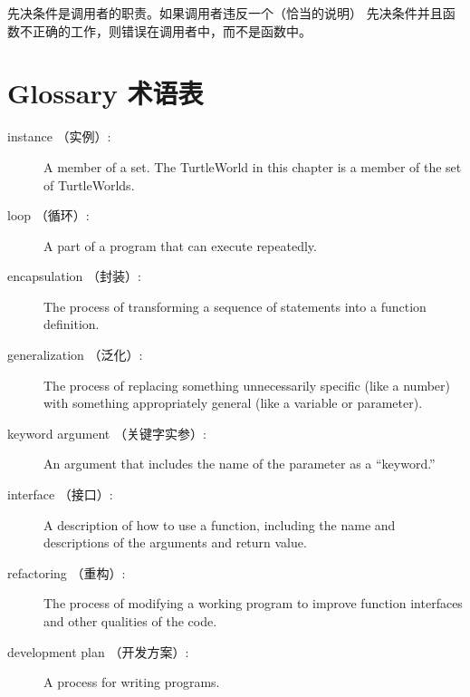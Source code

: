 \documentclass[10pt]{book}
\begin{document}
\begin{CJK}{UTF8}{gbsn}
先决条件是调用者的职责。如果调用者违反一个（恰当的说明）
先决条件并且函数不正确的工作，则错误在调用者中，而不是函数中。



\section{Glossary 术语表}

\begin{description}

\item[instance （实例）:] A member of a set.  The TurtleWorld in this
chapter is a member of the set of TurtleWorlds.

\item[loop （循环）:] A part of a program that can execute repeatedly.

\item[encapsulation （封装）:] The process of transforming a sequence of
statements into a function definition.

\item[generalization （泛化）:] The process of replacing something
unnecessarily specific (like a number) with something appropriately
general (like a variable or parameter).

\item[keyword argument （关键字实参）:] An argument that includes the name of
the parameter as a ``keyword.''

\item[interface （接口）:] A description of how to use a function, including
the name and descriptions of the arguments and return value.

\item[refactoring （重构）:] The process of modifying a working program to
  improve function interfaces and other qualities of the code.

\item[development plan （开发方案）:] A process for writing programs.


\end{description}
\end{CJK}
\end{document}
